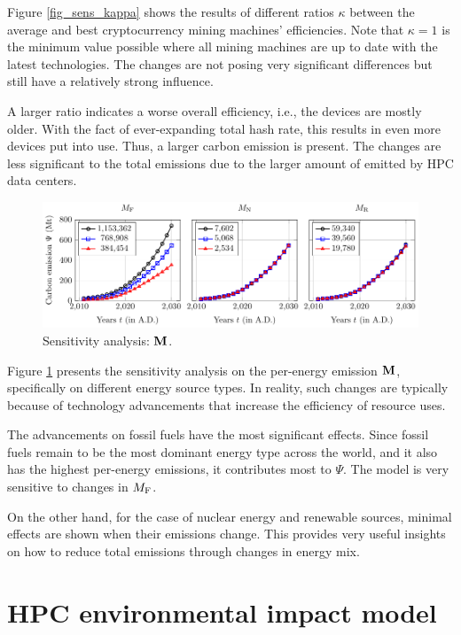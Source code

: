 \documentclass[12pt]{article}
\begin{document}
Figure \ref{fig_sens_kappa} shows the results of different ratios $\kappa$ between the average and best cryptocurrency mining machines' efficiencies. Note that $\kappa = 1$ is the minimum value possible where all mining machines are up to date with the latest technologies. The changes are not posing very significant differences but still have a relatively strong influence.

A larger ratio indicates a worse overall efficiency, i.e., the devices are mostly older. With the fact of ever-expanding total hash rate, this results in even more devices put into use. Thus, a larger carbon emission is present. The changes are less significant to the total  emissions due to the larger amount of  emitted by HPC data centers.

\begin{figure}[!t]
	\centering
	\includegraphics{figures/sensitivity/m.pdf}
	\caption{Sensitivity analysis: $\vb{M}$.}
	\label{fig_sens_m}
\end{figure}

Figure \ref{fig_sens_m} presents the sensitivity analysis on the per-energy  emission $\vb{M}$, specifically on different energy source types. In reality, such changes are typically because of technology advancements that increase the efficiency of resource uses.

The advancements on fossil fuels have the most significant effects. Since fossil fuels remain to be the most dominant energy type across the world, and it also has the highest per-energy emissions, it contributes most to $\Psi$. The model is very sensitive to changes in $M_{\rm F}$.

On the other hand, for the case of nuclear energy and renewable sources, minimal effects are shown when their  emissions change. This provides very useful insights on how to reduce total  emissions through changes in energy mix.

\section{HPC environmental impact model}
\end{document}
